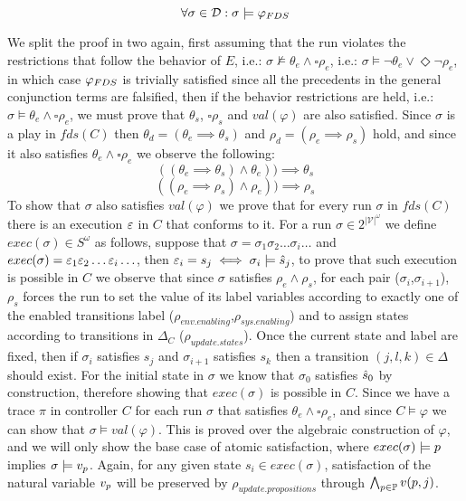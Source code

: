 \[\forall \sigma \in \mathcal{D}: \sigma \models \varphi_{FDS} \]

We split the proof in two again, first assuming that the run violates the restrictions that follow the behavior of $E$, i.e.: $\sigma \not\models \theta_e \wedge \square \rho_e$, i.e.: $\sigma \models \neg\theta_e \vee \Diamond \neg\rho_e$, in which case $\varphi_{FDS}$ is trivially satisfied since all the precedents in the general conjunction terms are falsified, then if the behavior restrictions are held, i.e.: $\sigma \models \theta_e \wedge \square \rho_e$, we must prove that $\theta_s$, $\square\rho_s$ and $val(\varphi)$ are also satisfied. Since $\sigma$ is a play in $fds(C)$ then $\theta_d=(\theta_e \implies \theta_s)$ and $\rho_d=(\rho_e \implies \rho_s)$ hold, and since it also satisfies $\theta_e \wedge \square \rho_e$ we observe the following:
\[((\theta_e \implies \theta_s) \wedge \theta_e))\implies \theta_s\]
\[((\rho_e \implies \rho_s) \wedge \rho_e))\implies \rho_s\]
To show that $\sigma$ also satisfies $val(\varphi)$ we prove that for every run $\sigma$ in $fds(C)$ there is an execution $\varepsilon$ in $C$ that conforms to it.
For a run $\sigma \in 2^{|\mathcal{V}|^{\omega}}$ we define $exec(\sigma) \in S^{\omega}$ as follows, suppose that $\sigma = \sigma_1 \sigma_2 \ldots \sigma_i \ldots$ and
$exec(\sigma)= \varepsilon_1 \varepsilon_2 \ldots \varepsilon_i \ldots$, then $\varepsilon_i = s_j \iff \sigma_i \models \hat{s}_{j}$, to prove that such execution is possible in $C$ we observe that since $\sigma$ satisfies $\rho_e \wedge \rho_s$, for each pair ($\sigma_i$,$\sigma_{i+1}$),  $\rho_s$ forces
the run to set the value of its label variables according to exactly one of the enabled transitions label ($\rho_{env.enabling}$,$\rho_{sys.enabling}$) and to assign states according to transitions in $\Delta_C$ ($\rho_{update.states}$). Once the current state and label are fixed, then if $\sigma_i$ satisfies $s_j$ and $\sigma_{i+1}$ satisfies $s_k$ then a transition $(j, l, k) \in \Delta$ should exist. For the initial state in $\sigma$ we know that $\sigma_0$ satisfies $\hat{s}_{0}$ by construction, therefore showing that $exec(\sigma)$ is possible in $C$.
Since we have a trace $\pi$ in controller $C$ for each run $\sigma$ that satisfies $\theta_e \wedge \square \rho_e$, and since $C \models \varphi$ we can show that $\sigma \models val(\varphi)$. This is proved over the algebraic construction of $\varphi$, and we will only show the base case of atomic satisfaction, where
$exec(\sigma) \models p$ implies $\sigma \models v_{p}$. Again, for any given state $s_i \in exec(\sigma)$, satisfaction of the natural variable $v_{p}$ will be preserved by  $\rho_{update.propositions}$ through $\bigwedge_{p \in \mathbb{P}}v(p,j)$.\\
\\

